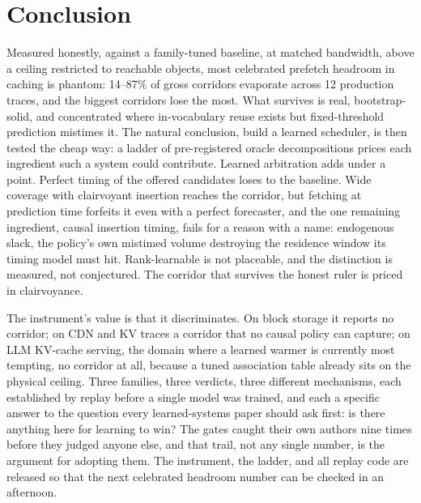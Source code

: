\documentclass[11pt]{article}
\begin{document}
\section{Conclusion}
Measured honestly, against a family-tuned baseline, at matched bandwidth, above a ceiling restricted to reachable objects, most celebrated prefetch headroom in caching is phantom: 14--87\% of gross corridors evaporate across 12 production traces, and the biggest corridors lose the most. What survives is real, bootstrap-solid, and concentrated where in-vocabulary reuse exists but fixed-threshold prediction mistimes it. The natural conclusion, build a learned scheduler, is then tested the cheap way: a ladder of pre-registered oracle decompositions prices each ingredient such a system could contribute. Learned arbitration adds under a point. Perfect timing of the offered candidates loses to the baseline. Wide coverage with clairvoyant insertion reaches the corridor, but fetching at prediction time forfeits it even with a perfect forecaster, and the one remaining ingredient, causal insertion timing, fails for a reason with a name: endogenous slack, the policy's own mistimed volume destroying the residence window its timing model must hit. Rank-learnable is not placeable, and the distinction is measured, not conjectured. The corridor that survives the honest ruler is priced in clairvoyance.

The instrument's value is that it discriminates. On block storage it reports no corridor; on CDN and KV traces a corridor that no causal policy can capture; on LLM KV-cache serving, the domain where a learned warmer is currently most tempting, no corridor at all, because a tuned association table already sits on the physical ceiling. Three families, three verdicts, three different mechanisms, each established by replay before a single model was trained, and each a specific answer to the question every learned-systems paper should ask first: is there anything here for learning to win? The gates caught their own authors nine times before they judged anyone else, and that trail, not any single number, is the argument for adopting them. The instrument, the ladder, and all replay code are released so that the next celebrated headroom number can be checked in an afternoon.
\end{document}
